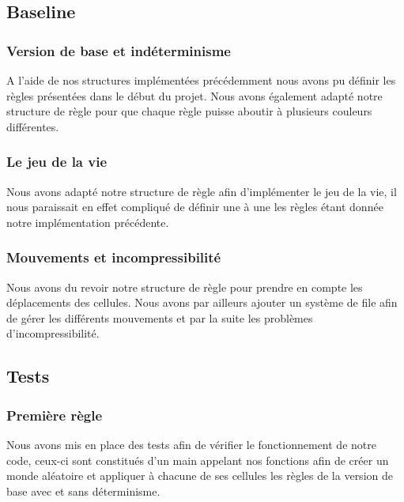 \documentclass{article}
\begin{document}
    {
    
    \subsection{Baseline}
        {
        \subsubsection{Version de base et indéterminisme}
        {
        A l'aide de nos structures implémentées précédemment nous avons pu définir les règles présentées dans le début du projet. Nous avons également adapté notre structure de règle pour que chaque règle puisse aboutir à plusieurs couleurs différentes.
        
        }
    
        \subsubsection{Le jeu de la vie}
        {
        Nous avons adapté notre structure de règle afin d'implémenter le jeu de la vie, il nous paraissait en effet compliqué de définir une à une les règles étant donnée notre implémentation précédente.
        
        }
        
        
        \subsubsection{Mouvements et incompressibilité}
            {
            Nous avons du revoir notre structure de règle pour prendre en compte les déplacements des cellules. Nous avons par ailleurs ajouter un système de file afin de gérer les différents mouvements et par la suite les problèmes d'incompressibilité.
            
            }
    
        }
    
    
    
    
    \subsection{Tests}
        {
        \subsubsection{Première règle}
            {
            Nous avons mis en place des tests afin de vérifier le fonctionnement de notre code, ceux-ci sont constitués d'un main appelant nos fonctions afin de créer un monde aléatoire et appliquer à chacune de ses cellules les règles de la version de base avec et sans déterminisme.
        
}}}
\end{document}
